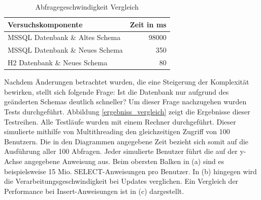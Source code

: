 \begin{table}[htbp]
\centering
\begin{tabular} {l | r}
Versuchskomponente & Zeit in ms  \\ \hline
MSSQL Datenbank \& Altes Schema & 98000 \\
MSSQL Datenbank \& Neues Schema & 350 \\
H2 Datenbank \& Neues Schema & 80 \\
\end{tabular}
\caption{Abfragegeschwindigkeit Vergleich}
\label{tb:vergleichAbfragegeschwindigkeit}
\end{table}

Nachdem Änderungen betrachtet wurden, die eine Steigerung der Komplexität bewirken, stellt sich folgende Frage: Ist die Datenbank nur aufgrund des geänderten Schemas deutlich schneller? Um dieser Frage nachzugehen wurden Tests durchgeführt. Abbildung \ref{ergebniss_vergleich} zeigt die Ergebnisse dieser Testreihen. Alle Testläufe wurden mit einem Rechner durchgeführt. Dieser simulierte mithilfe von Multithreading den gleichzeitigen Zugriff von 100 Benutzern. Die in den Diagrammen angegebene Zeit bezieht sich somit auf die Ausführung aller 100 Abfragen. Jeder simulierte Benutzer führt die auf der y-Achse angegebene Anweisung aus. Beim obersten Balken in (a) sind es beispielsweise 15 Mio. SELECT-Anweisungen pro Benutzer. In (b) hingegen wird die Verarbeitungsgeschwindigkeit bei Updates verglichen. Ein Vergleich der Performance bei Insert-Anweisungen ist in (c) dargestellt.    

